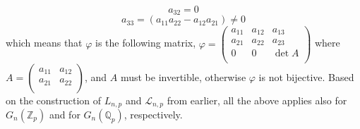 \documentclass[12pt]{article}
\begin{document}
$$a_{32}=0$$
$$a_{33}=(a_{11}a_{22}-a_{12}a_{21})\neq 0
$$
which means that $\varphi$ is the following matrix, $\varphi=\begin{pmatrix}
a_{11} & a_{12} & a_{13}\\
a_{21} & a_{22} & a_{23}\\
0 & 0 & \det A\\
\end{pmatrix}
$
where $A=\begin{pmatrix}
a_{11} & a_{12}\\
a_{21} & a_{22}\\
\end{pmatrix}
$, and $A$ must be invertible, otherwise $\varphi$ is not bijective. Based on the construction of $L_{n,p}$ and $\mathcal{L}_{n,p}$ from earlier, all the above applies also for $G_n(\mathbb{Z}_p)$ and for $G_n(\mathbb{Q}_p)$, respectively.
\end{document}
